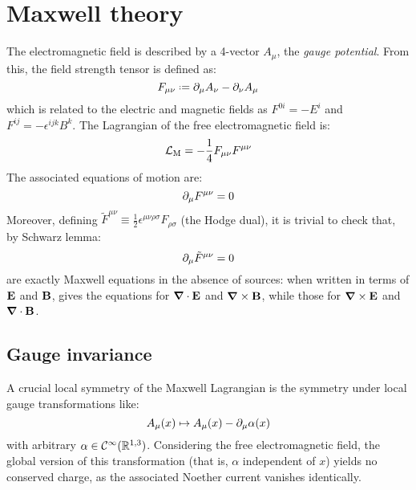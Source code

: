 
\section{Maxwell theory}

The electromagnetic field is described by a 4-vector $ A_\mu $, the \textit{gauge potential}. From this, the field strength tensor is defined as:
\begin{equation}
  F_{\mu \nu} \defeq \pa_\mu A_\nu - \pa_\nu A_\mu
\end{equation}
which is related to the electric and magnetic fields as $ F^{0i} = - E^i $ and $ F^{ij} = - \epsilon^{ijk} B^k $. The Lagrangian of the free electromagnetic field is:
\begin{equation}
  \mathcal{L}_\text{M} = - \frac{1}{4} F_{\mu \nu} F^{\mu \nu}
  \label{eq:maxw-lag}
\end{equation}
The associated equations of motion are:
\begin{equation}
  \partial_\mu F^{\mu \nu} = 0
  \label{eq:maxw-1}
\end{equation}
Moreover, defining $ \tilde{F}^{\mu \nu} \equiv \frac{1}{2} \epsilon^{\mu \nu \rho \sigma} F_{\rho \sigma} $ (the Hodge dual), it is trivial to check that, by Schwarz lemma:
\begin{equation}
  \partial_\mu \tilde{F}^{\mu \nu} = 0
  \label{eq:maxw-2}
\end{equation}
 are exactly Maxwell equations in the absence of sources: when written in terms of $ \mathbf{E} $ and $ \mathbf{B} $,  gives the equations for $ \boldsymbol{\nabla} \cdot \mathbf{E} $ and $ \boldsymbol{\nabla} \times \mathbf{B} $, while  those for $ \boldsymbol{\nabla} \times \mathbf{E} $ and $ \boldsymbol{\nabla} \cdot \mathbf{B} $.

\subsection{Gauge invariance}

A crucial local symmetry of the Maxwell Lagrangian is the symmetry under local gauge transformations like:
\begin{equation}
  A_\mu(x) \mapsto A_\mu(x) - \partial_\mu \alpha(x)
  \label{eq:qed-gauge-inv}
\end{equation}
with arbitrary $ \alpha \in \mathcal{C}^\infty(\mathbb{R}^{1,3}) $. Considering the free electromagnetic field, the global version of this transformation (that is, $ \alpha $ independent of $ x $) yields no conserved charge, as the associated Noether current vanishes identically.

